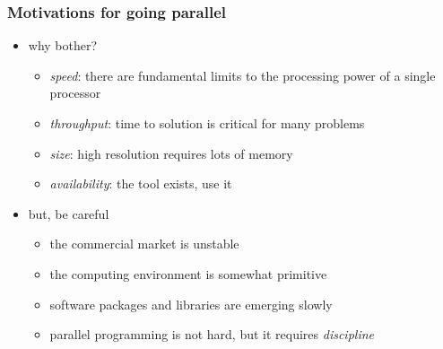 %
%
%
%


\begin{frame}[fragile]
%
  \frametitle{Motivations for going parallel}
%
  \begin{itemize}
%
  \item why bother?
    \begin{itemize}
    \item {\em speed}: there are fundamental limits to the processing power of a single processor
    \item {\em throughput}: time to solution is critical for many problems
    \item {\em size}: high resolution requires lots of memory
    \item {\em availability}: the tool exists, use it
    \end{itemize}
%
  \item but, be careful
    \begin{itemize}
    \item the commercial market is unstable
    \item the computing environment is somewhat primitive
    \item software packages and libraries are emerging slowly
    \item parallel programming is not hard, but it requires {\em discipline}
    \end{itemize}
%
  \end{itemize}
%
\end{frame}

